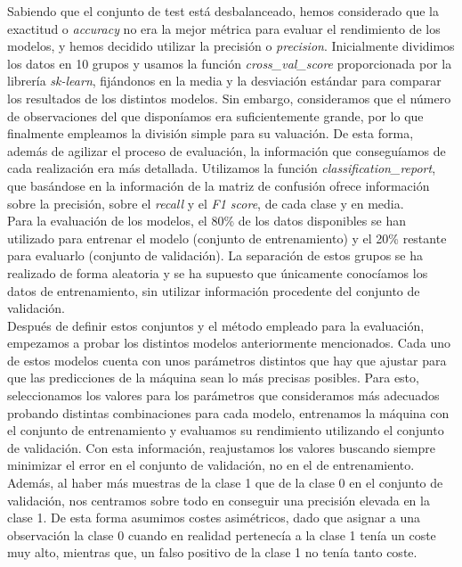 \documentclass[journal,twoside]{JoPhA}
\begin{document}
Sabiendo que el conjunto de test está desbalanceado, hemos considerado que la exactitud o \textit{accuracy} no era la mejor métrica para evaluar el rendimiento de los modelos, y hemos decidido utilizar la precisión o \textit{precision}. Inicialmente dividimos los datos en 10 grupos y usamos la función \textit{cross\_val\_score} proporcionada por la librería \emph{sk-learn}\cite{validacion_cruzada}, fijándonos en la media y la desviación estándar para comparar los resultados de los distintos modelos. Sin embargo, consideramos que el número de observaciones del que disponíamos era suficientemente grande, por lo que finalmente empleamos la división simple para su valuación. De esta forma, además de agilizar el proceso de evaluación, la información que conseguíamos de cada realización era más detallada. Utilizamos la función \textit{classification\_report}, que basándose en la información de la matriz de confusión ofrece información sobre la precisión, sobre el \textit{recall} y el \textit{F1 score}, de cada clase y en media. \\

Para la evaluación de los modelos, el 80\% de los datos disponibles se han utilizado para entrenar el modelo (conjunto de entrenamiento) y el 20\% restante para evaluarlo (conjunto de validación). La separación de estos grupos se ha realizado de forma aleatoria y se ha supuesto que únicamente conocíamos los datos de entrenamiento, sin utilizar información procedente del conjunto de validación. \\

Después de definir estos conjuntos y el método empleado para la evaluación, empezamos a probar los distintos modelos anteriormente mencionados. Cada uno de estos modelos cuenta con unos parámetros distintos que hay que ajustar para que las predicciones de la máquina sean lo más precisas posibles. Para esto, seleccionamos los valores para los parámetros que consideramos más adecuados probando distintas combinaciones para cada modelo, entrenamos la máquina con el conjunto de entrenamiento y evaluamos su rendimiento utilizando el conjunto de validación. Con esta información, reajustamos los valores buscando siempre minimizar el error en el conjunto de validación, no en el de entrenamiento. Además, al haber más muestras de la clase 1 que de la clase 0 en el conjunto de validación, nos centramos sobre todo en conseguir una precisión elevada en la clase 1. De esta forma asumimos costes asimétricos, dado que asignar a una observación la clase 0 cuando en realidad pertenecía a la clase 1 tenía un coste muy alto, mientras que, un falso positivo de la clase 1 no tenía tanto coste. \\
\end{document}
